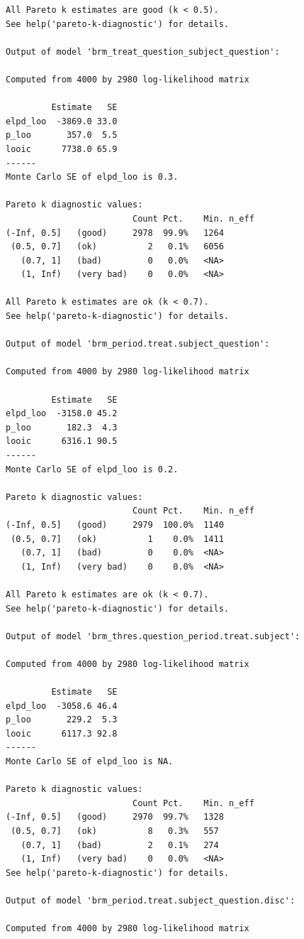 \documentclass[
  12pt,
  a4paper,
  extrafontsizes,
  onecolumn,
  openright]{memoir}
\begin{document}
\begin{verbatim}
All Pareto k estimates are good (k < 0.5).
See help('pareto-k-diagnostic') for details.

Output of model 'brm_treat_question_subject_question':

Computed from 4000 by 2980 log-likelihood matrix

         Estimate   SE
elpd_loo  -3869.0 33.0
p_loo       357.0  5.5
looic      7738.0 65.9
------
Monte Carlo SE of elpd_loo is 0.3.

Pareto k diagnostic values:
                         Count Pct.    Min. n_eff
(-Inf, 0.5]   (good)     2978  99.9%   1264      
 (0.5, 0.7]   (ok)          2   0.1%   6056      
   (0.7, 1]   (bad)         0   0.0%   <NA>      
   (1, Inf)   (very bad)    0   0.0%   <NA>      

All Pareto k estimates are ok (k < 0.7).
See help('pareto-k-diagnostic') for details.

Output of model 'brm_period.treat.subject_question':

Computed from 4000 by 2980 log-likelihood matrix

         Estimate   SE
elpd_loo  -3158.0 45.2
p_loo       182.3  4.3
looic      6316.1 90.5
------
Monte Carlo SE of elpd_loo is 0.2.

Pareto k diagnostic values:
                         Count Pct.    Min. n_eff
(-Inf, 0.5]   (good)     2979  100.0%  1140      
 (0.5, 0.7]   (ok)          1    0.0%  1411      
   (0.7, 1]   (bad)         0    0.0%  <NA>      
   (1, Inf)   (very bad)    0    0.0%  <NA>      

All Pareto k estimates are ok (k < 0.7).
See help('pareto-k-diagnostic') for details.

Output of model 'brm_thres.question_period.treat.subject':

Computed from 4000 by 2980 log-likelihood matrix

         Estimate   SE
elpd_loo  -3058.6 46.4
p_loo       229.2  5.3
looic      6117.3 92.8
------
Monte Carlo SE of elpd_loo is NA.

Pareto k diagnostic values:
                         Count Pct.    Min. n_eff
(-Inf, 0.5]   (good)     2970  99.7%   1328      
 (0.5, 0.7]   (ok)          8   0.3%   557       
   (0.7, 1]   (bad)         2   0.1%   274       
   (1, Inf)   (very bad)    0   0.0%   <NA>      
See help('pareto-k-diagnostic') for details.

Output of model 'brm_period.treat.subject_question.disc':

Computed from 4000 by 2980 log-likelihood matrix


\end{verbatim}
\end{document}
